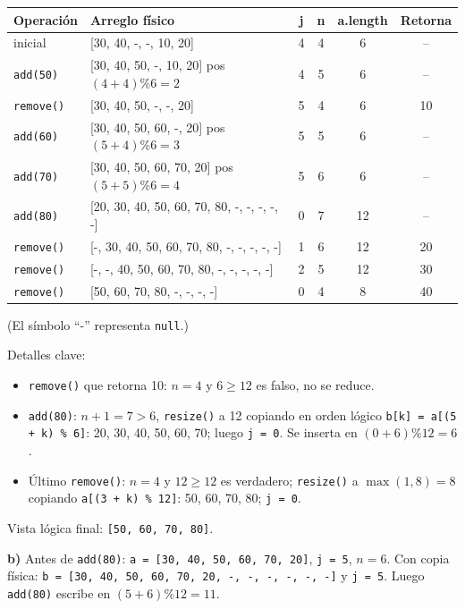 \documentclass[11pt,a4paper]{article}
\begin{document}
\begin{center}
\small
\begin{tabular}{lp{6.6cm}cccc}
\toprule
\textbf{Operación} & \textbf{Arreglo físico} & \textbf{j} & \textbf{n} & \textbf{a.length} & \textbf{Retorna} \\
\midrule
inicial & [30, 40, -, -, 10, 20] & 4 & 4 & 6 & -- \\
\texttt{add(50)} & [30, 40, 50, -, 10, 20] \hfill pos $(4+4)\%6 = 2$ & 4 & 5 & 6 & -- \\
\texttt{remove()} & [30, 40, 50, -, -, 20] & 5 & 4 & 6 & 10 \\
\texttt{add(60)} & [30, 40, 50, 60, -, 20] \hfill pos $(5+4)\%6 = 3$ & 5 & 5 & 6 & -- \\
\texttt{add(70)} & [30, 40, 50, 60, 70, 20] \hfill pos $(5+5)\%6 = 4$ & 5 & 6 & 6 & -- \\
\texttt{add(80)} & [20, 30, 40, 50, 60, 70, 80, -, -, -, -, -] & 0 & 7 & 12 & -- \\
\texttt{remove()} & [-, 30, 40, 50, 60, 70, 80, -, -, -, -, -] & 1 & 6 & 12 & 20 \\
\texttt{remove()} & [-, -, 40, 50, 60, 70, 80, -, -, -, -, -] & 2 & 5 & 12 & 30 \\
\texttt{remove()} & [50, 60, 70, 80, -, -, -, -] & 0 & 4 & 8 & 40 \\
\bottomrule
\end{tabular}
\end{center}
(El símbolo ``-'' representa \texttt{null}.)

Detalles clave:
\begin{itemize}[itemsep=1pt]
\item \texttt{remove()} que retorna 10: $n = 4$ y $6 \ge 12$ es falso, no se reduce.
\item \texttt{add(80)}: $n + 1 = 7 > 6$, \texttt{resize()} a 12 copiando en orden lógico \texttt{b[k] = a[(5 + k) \% 6]}: 20, 30, 40, 50, 60, 70; luego \texttt{j = 0}. Se inserta en $(0 + 6) \% 12 = 6$.
\item Último \texttt{remove()}: $n = 4$ y $12 \ge 12$ es verdadero; \texttt{resize()} a $\max(1, 8) = 8$ copiando \texttt{a[(3 + k) \% 12]}: 50, 60, 70, 80; \texttt{j = 0}.
\end{itemize}
Vista lógica final: \texttt{[50, 60, 70, 80]}.

\textbf{b)} Antes de \texttt{add(80)}: \texttt{a = [30, 40, 50, 60, 70, 20]}, \texttt{j = 5}, $n = 6$. Con copia física: \texttt{b = [30, 40, 50, 60, 70, 20, -, -, -, -, -, -]} y \texttt{j = 5}. Luego \texttt{add(80)} escribe en $(5 + 6) \% 12 = 11$.
\end{document}

